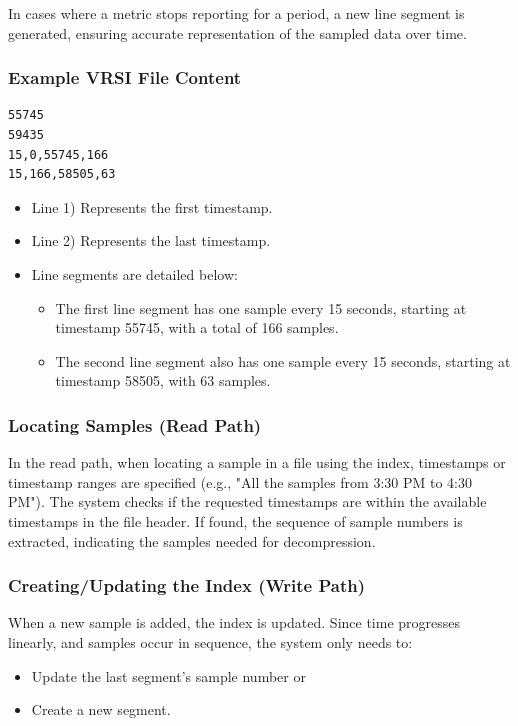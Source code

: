 \documentclass[conference]{IEEEtran}
\begin{document}
In cases where a metric stops reporting for a period, a new line segment is generated, ensuring accurate representation of the sampled data over time.
\vspace{5pt}
\subsubsection{Example VRSI File Content}

\begin{verbatim}
55745
59435
15,0,55745,166
15,166,58505,63
\end{verbatim}


\begin{itemize}
    \item Line 1) Represents the first timestamp.
    \item Line 2) Represents the last timestamp.
    \item Line segments are detailed below:
    \begin{itemize}
        \item The first line segment has one sample every 15 seconds, starting at timestamp 55745, with a total of 166 samples.
        \item The second line segment also has one sample every 15 seconds, starting at timestamp 58505, with 63 samples.
    \end{itemize}
\end{itemize}
\vspace{5pt}
\subsubsection{Locating Samples (Read Path)}

In the read path, when locating a sample in a file using the index, timestamps or timestamp ranges are specified (e.g., "All the samples from 3:30 PM to 4:30 PM"). The system checks if the requested timestamps are within the available timestamps in the file header. If found, the sequence of sample numbers is extracted, indicating the samples needed for decompression.
\vspace{5pt}
\subsubsection{Creating/Updating the Index (Write Path)}

When a new sample is added, the index is updated. Since time progresses linearly, and samples occur in sequence, the system only needs to:
\begin{itemize}
    \item Update the last segment's sample number or
    \item Create a new segment.
\end{itemize}
\end{document}
